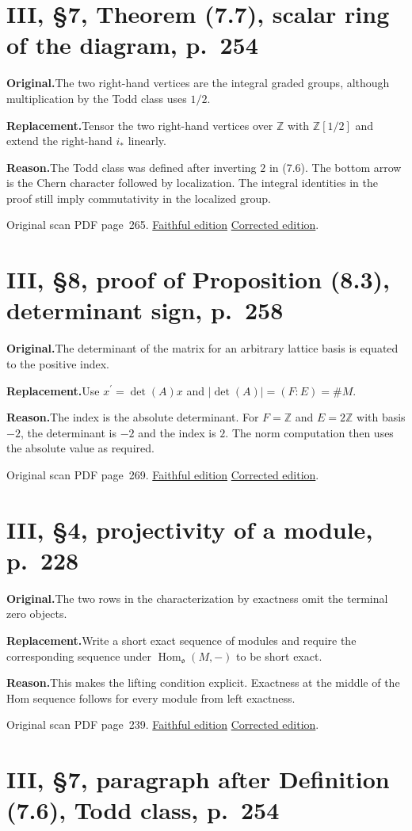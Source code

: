 \documentclass[11pt,a4paper]{article}
\newcommand{\original}{\par\smallskip\noindent\textbf{Original.}\enspace}
\newcommand{\replacement}{\par\smallskip\noindent\textbf{Replacement.}\enspace}
\newcommand{\reason}{\par\smallskip\noindent\textbf{Reason.}\enspace}
\newcommand{\editionlink}[3]{\href{#1\#errata.#2}{#3}}
\newcommand{\location}[2]{%
  \par\smallskip\noindent Original scan PDF page~#2.\enspace
  \editionlink{Neukirch_Faithful.pdf}{#1}{Faithful edition}
  \quad\editionlink{Neukirch_Corrected.pdf}{#1}{Corrected edition}.}
\begin{document}
\setcounter{section}{85}
\section{III, \S7, Theorem (7.7), scalar ring of the diagram, p.~254}\label{errata:item:86}

\original The two right-hand vertices are the integral graded groups, although multiplication by the Todd class uses $1/2$.
\replacement Tensor the two right-hand vertices over $\mathbb Z$ with $\mathbb Z[1/2]$ and extend the right-hand $i_*$ linearly.
\reason The Todd class was defined after inverting $2$ in (7.6). The bottom arrow is the Chern character followed by localization. The integral identities in the proof still imply commutativity in the localized group.
\location{86}{265}

\setcounter{section}{86}
\section{III, \S8, proof of Proposition (8.3), determinant sign, p.~258}\label{errata:item:87}

\original The determinant of the matrix for an arbitrary lattice basis is equated to the positive index.
\replacement Use $x^{\prime}=\det(A)x$ and $|\det(A)|=(F:E)=\#M$.
\reason The index is the absolute determinant. For $F=\mathbb Z$ and $E=2\mathbb Z$ with basis $-2$, the determinant is $-2$ and the index is $2$. The norm computation then uses the absolute value as required.
\location{87}{269}

\setcounter{section}{87}
\section{III, \S4, projectivity of a module, p.~228}\label{errata:item:88}

\original The two rows in the characterization by exactness omit the terminal zero objects.
\replacement Write a short exact sequence of modules and require the corresponding sequence under $\operatorname{Hom}_{\mathfrak o}(M,-)$ to be short exact.
\reason This makes the lifting condition explicit. Exactness at the middle of the Hom sequence follows for every module from left exactness.
\location{88}{239}

\setcounter{section}{88}
\section{III, \S7, paragraph after Definition (7.6), Todd class, p.~254}\label{errata:item:89}
\end{document}
